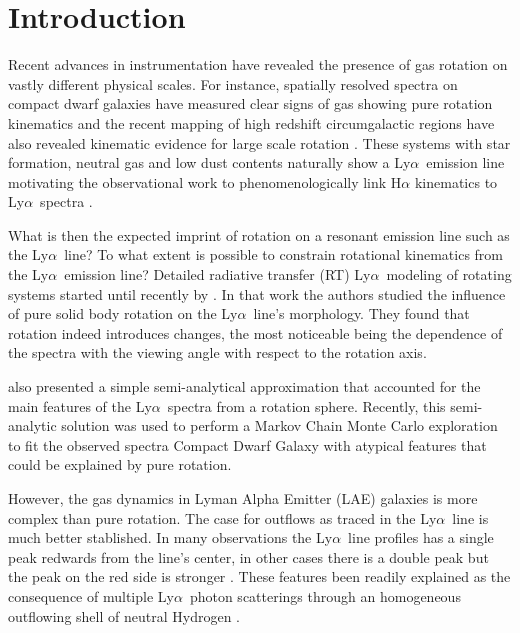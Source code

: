 \documentclass[a4paper,fleqn,usenatbib]{mnras}
\newcommand{\lya}{\ifmmode{{\rm Ly}\alpha}\else Ly$\alpha$\ \fi}
\begin{document}

\section{Introduction}
\label{sec:intro}

Recent advances in instrumentation have revealed the presence of gas
rotation on vastly different physical scales.
For instance, spatially resolved spectra on compact dwarf galaxies
have measured clear signs of gas showing pure rotation kinematics
\citep{2015A&A...577A..21C,2017A&A...600A.125C} and the recent mapping of
high redshift circumgalactic regions have also revealed kinematic
evidence for large scale rotation \citep{2018MNRAS.473.3907A}.
These systems with star formation, neutral gas and low dust
contents naturally show a \lya emission line \citep{PartridgePeebles}
motivating the observational work to phenomenologically link
H$\alpha$ kinematics to \lya spectra \citep[e.g.][]{Herenz2016}. 


What is then the expected imprint of rotation on a resonant emission
line such as the \lya line? To what extent is possible to constrain
rotational kinematics from the \lya emission line? 
Detailed radiative transfer (RT) \lya modeling of rotating systems
started until recently by \cite{Garavito14}.
In that work the authors studied the influence of pure solid body
rotation on the \lya line's morphology.
They found that rotation indeed introduces changes, the most
noticeable being the dependence of the spectra with the viewing
angle with respect to the rotation axis. 

\cite{Garavito14} also presented a simple semi-analytical
approximation that accounted for the main features of the \lya spectra
from a rotation sphere.
Recently, this semi-analytic solution was used to perform a Markov
Chain Monte Carlo exploration to fit the observed spectra Compact
Dwarf Galaxy \citep{tololo} with atypical features that could be
explained by pure rotation.  

However, the gas dynamics in Lyman Alpha Emitter (LAE) galaxies is
more complex than pure rotation.
The case for outflows as traced in the \lya line is much better
stablished.
In many observations the \lya line profiles has a single peak
redwards from the line's center, in other cases there is a double peak
but the peak on the red side is stronger
\citep[e.g.][]{2010ApJ...717..289S,Erb14,Trainor16}.   
These features been readily explained as the consequence of multiple
\lya photon scatterings through an homogeneous outflowing shell of
neutral Hydrogen
\citep{2006A&A...460..397V,Orsi12,2012ApJ...751...29Y,2015ApJ...812..123G}.  
\end{document}
